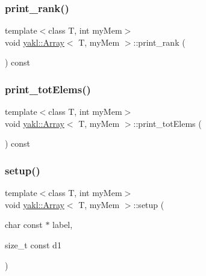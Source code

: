 \mbox{\label{classyakl_1_1Array_a136bdaac16343e41a7b3c19f1b1ee670}} 
\subsubsection{\texorpdfstring{print\+\_\+rank()}{print\_rank()}}
{\footnotesize\ttfamily template$<$class T, int my\+Mem$>$ \\
void \hyperlink{classyakl_1_1Array}{yakl\+::\+Array}$<$ T, my\+Mem $>$\+::print\+\_\+rank (\begin{DoxyParamCaption}{ }\end{DoxyParamCaption}) const\hspace{0.3cm}{\ttfamily [inline]}}

\mbox{\label{classyakl_1_1Array_aac2e9242b98e126aedf149c53b4998ea}} 
\subsubsection{\texorpdfstring{print\+\_\+tot\+Elems()}{print\_totElems()}}
{\footnotesize\ttfamily template$<$class T, int my\+Mem$>$ \\
void \hyperlink{classyakl_1_1Array}{yakl\+::\+Array}$<$ T, my\+Mem $>$\+::print\+\_\+tot\+Elems (\begin{DoxyParamCaption}{ }\end{DoxyParamCaption}) const\hspace{0.3cm}{\ttfamily [inline]}}

\mbox{\label{classyakl_1_1Array_ae917f79f12b290dcd8083233d1d799c4}} 
\subsubsection{\texorpdfstring{setup()}{setup()}\hspace{0.1cm}{\footnotesize\ttfamily [1/8]}}
{\footnotesize\ttfamily template$<$class T, int my\+Mem$>$ \\
void \hyperlink{classyakl_1_1Array}{yakl\+::\+Array}$<$ T, my\+Mem $>$\+::setup (\begin{DoxyParamCaption}\item[{char const $\ast$}]{label,  }\item[{size\+\_\+t const}]{d1 }\end{DoxyParamCaption})\hspace{0.3cm}{\ttfamily [inline]}}

